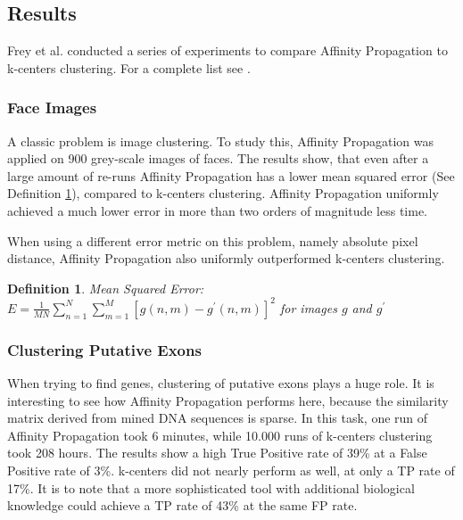 \documentclass[11pt,a4paper]{article}
\newtheorem{definition}{Definition}
\begin{document}
\subsection{Results}
Frey et al. conducted a series of experiments to compare Affinity Propagation to k-centers clustering. For a complete list see \cite{frey2007clustering}.
\subsubsection{Face Images}
A classic problem is image clustering. To study this, Affinity Propagation was applied on 900 grey-scale images of faces. The results show, that even after a large amount of re-runs Affinity Propagation has a lower mean squared error (See Definition \ref{def:mse}), compared to k-centers clustering. Affinity Propagation uniformly achieved a much lower error in more than two orders of magnitude less time.

When using a different error metric on this problem, namely absolute pixel distance, Affinity Propagation also uniformly outperformed k-centers clustering.
\begin{definition} \label{def:mse}
	Mean Squared Error: $E = \frac{1}{M N}\sum\limits_{n=1}^{N}\sum\limits_{m=1}^{M} \left[g(n,m) - g^\prime (n,m)\right]^2$ for images $g$ and $g^\prime$
\end{definition}
\subsubsection{Clustering Putative Exons}
When trying to find genes, clustering of putative exons plays a huge role. It is interesting to see how Affinity Propagation performs here, because the similarity matrix derived from mined DNA sequences is sparse. In this task, one run of Affinity Propagation took 6 minutes, while 10.000 runs of k-centers clustering took 208 hours. The results show a high True Positive rate of 39\% at a False Positive rate of 3\%. k-centers did not nearly perform as well, at only a TP rate of 17\%. It is to note that a more sophisticated tool with additional biological knowledge could achieve a TP rate of 43\% at the same FP rate.
\end{document}
